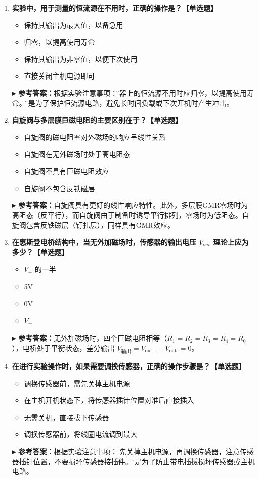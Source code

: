 \documentclass[12pt,a4paper]{article}
\newcommand{\answer}[1]{\vspace{2pt}\noindent\textbf{\color{teal!80!black}▸ 参考答案：}#1\vspace{4pt}}
\begin{document}
\begin{enumerate}[label=\arabic*.]
    \item \textbf{实验中，用于测量的恒流源在不用时，正确的操作是？【单选题】}
    \begin{itemize}
        \item 保持其输出为最大值，以备急用
        \item[\checkmark] 归零，以提高使用寿命
        \item 保持其输出为非零值，以便下次使用
        \item 直接关闭主机电源即可
    \end{itemize}
    \answer{根据实验注意事项：\"仪器上的恒流源不用时应归零，以提高使用寿命。\"这是为了保护恒流源电路，避免长时间负载或下次开机时产生冲击。}

    \item \textbf{自旋阀与多层膜巨磁电阻的主要区别在于？【单选题】}
    \begin{itemize}
        \item[\checkmark] 自旋阀的磁电阻率对外磁场的响应呈线性关系
        \item 自旋阀在无外磁场时处于高电阻态
        \item 自旋阀不具有巨磁电阻效应
        \item 自旋阀不包含反铁磁层
    \end{itemize}
    \answer{自旋阀具有更好的线性响应特性。此外，多层膜GMR零场时为高阻态（反平行），而自旋阀由于制备时诱导平行排列，零场时为低阻态。自旋阀包含反铁磁层（钉扎层），同样具有GMR效应。}

    \item \textbf{在惠斯登电桥结构中，当无外加磁场时，传感器的输出电压 \(V_{out}\) 理论上应为多少？【单选题】}
    \begin{itemize}
        \item \(V_+\) 的一半
        \item 5V
        \item[\checkmark] 0V
        \item \(V_+\)
    \end{itemize}
    \answer{无外加磁场时，四个巨磁电阻相等（$R_1=R_2=R_3=R_4=R_0$），电桥处于平衡状态，差分输出 $V_{\text{输出}} = V_{\text{out+}} - V_{\text{out-}} = 0$。}

    \item \textbf{在进行实验操作时，如果需要调换传感器，正确的操作步骤是？【单选题】}
    \begin{itemize}
        \item[\checkmark] 调换传感器前，需先关掉主机电源
        \item 在主机开机状态下，将传感器插针位置对准后直接插入
        \item 无需关机，直接拔下传感器
        \item 调换传感器前，将线圈电流调到最大
    \end{itemize}
    \answer{根据实验注意事项：\"需先关掉主机电源，再调换传感器，注意传感器插针位置，不要损坏传感器接插件。\"这是为了防止带电插拔损坏传感器或主机电路。}
\end{enumerate}
\end{document}
